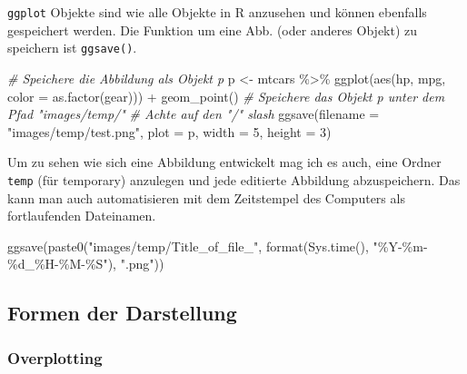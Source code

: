 \documentclass[
]{article}
\newenvironment{Shaded}{\begin{snugshade}}{\end{snugshade}}
\newcommand{\AttributeTok}[1]{\textcolor[rgb]{0.77,0.63,0.00}{#1}}
\newcommand{\CommentTok}[1]{\textcolor[rgb]{0.56,0.35,0.01}{\textit{#1}}}
\newcommand{\DecValTok}[1]{\textcolor[rgb]{0.00,0.00,0.81}{#1}}
\newcommand{\FunctionTok}[1]{\textcolor[rgb]{0.00,0.00,0.00}{#1}}
\newcommand{\NormalTok}[1]{#1}
\newcommand{\OtherTok}[1]{\textcolor[rgb]{0.56,0.35,0.01}{#1}}
\newcommand{\SpecialCharTok}[1]{\textcolor[rgb]{0.00,0.00,0.00}{#1}}
\newcommand{\StringTok}[1]{\textcolor[rgb]{0.31,0.60,0.02}{#1}}
\begin{document}
\texttt{ggplot} Objekte sind wie alle Objekte in R anzusehen und können ebenfalls gespeichert werden. Die Funktion um eine Abb. (oder anderes Objekt) zu speichern ist \texttt{ggsave()}.

\begin{Shaded}
\begin{Highlighting}[]
\CommentTok{\# Speichere die Abbildung als Objekt p}
\NormalTok{p }\OtherTok{\textless{}{-}}\NormalTok{ mtcars }\SpecialCharTok{\%\textgreater{}\%}
  \FunctionTok{ggplot}\NormalTok{(}\FunctionTok{aes}\NormalTok{(hp, mpg, }\AttributeTok{color =} \FunctionTok{as.factor}\NormalTok{(gear))) }\SpecialCharTok{+}
  \FunctionTok{geom\_point}\NormalTok{()}
\CommentTok{\# Speichere das Objekt p unter dem Pfad "images/temp/"}
\CommentTok{\# Achte auf den "/" slash}
\FunctionTok{ggsave}\NormalTok{(}\AttributeTok{filename =} \StringTok{"images/temp/test.png"}\NormalTok{, }\AttributeTok{plot =}\NormalTok{ p, }\AttributeTok{width =} \DecValTok{5}\NormalTok{, }\AttributeTok{height =} \DecValTok{3}\NormalTok{)}
\end{Highlighting}
\end{Shaded}

Um zu sehen wie sich eine Abbildung entwickelt mag ich es auch, eine Ordner \texttt{temp} (für temporary) anzulegen und jede editierte Abbildung abzuspeichern. Das kann man auch automatisieren mit dem Zeitstempel des Computers als fortlaufenden Dateinamen.

\begin{Shaded}
\begin{Highlighting}[]
\FunctionTok{ggsave}\NormalTok{(}\FunctionTok{paste0}\NormalTok{(}\StringTok{"images/temp/Title\_of\_file\_"}\NormalTok{, }\FunctionTok{format}\NormalTok{(}\FunctionTok{Sys.time}\NormalTok{(), }\StringTok{"\%Y{-}\%m{-}\%d\_\%H{-}\%M{-}\%S"}\NormalTok{), }\StringTok{".png"}\NormalTok{))}
\end{Highlighting}
\end{Shaded}

\hypertarget{formen-der-darstellung}{%
\subsection{Formen der Darstellung}\label{formen-der-darstellung}}

\hypertarget{overplotting}{%
\subsubsection{Overplotting}\label{overplotting}}
\end{document}
